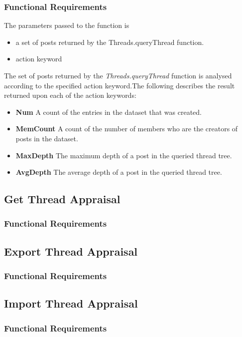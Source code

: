 \documentclass[a4paper]{article}
\begin{document}
\subsubsection {Functional Requirements} The parameters passed to the function is

\begin{itemize}
\item a set of posts returned by the Threads.queryThread function.
\item action keyword
\end{itemize}
The set of posts returned by the \textit{Threads.queryThread} function is analysed according to the
specified action keyword.The following describes the result returned upon each of the action
keywords:
\begin{itemize}
\item \textbf{Num} A count of the entries in the dataset that was created.
\item \textbf{MemCount} A count of the number of members who are the creators of posts in the dataset.
\item \textbf{MaxDepth} The maximum depth of a post in the queried thread tree.
\item \textbf{AvgDepth} The average depth of a post in the queried thread tree.
\end{itemize}
\subsection {Get Thread Appraisal} 

\subsubsection {Functional Requirements} 

\subsection {Export Thread Appraisal} 

\subsubsection {Functional Requirements} 

\subsection {Import Thread Appraisal} 

\subsubsection {Functional Requirements} 
\end{document}
